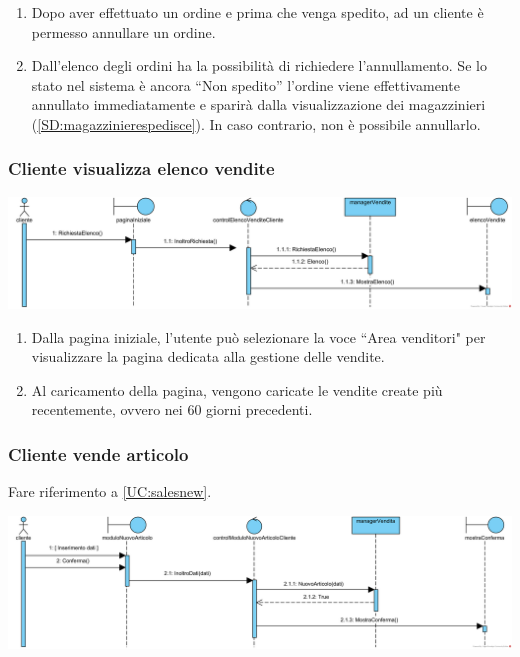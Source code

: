 \documentclass[12pt,a4paper]{article}
\begin{document}
\begin{enumerate}
\item Dopo aver effettuato un ordine e prima che venga spedito, ad un cliente è permesso annullare un ordine.
\item Dall'elenco degli ordini ha la possibilità di richiedere l'annullamento. Se lo stato nel sistema è ancora ``Non spedito'' l'ordine viene effettivamente annullato immediatamente e sparirà dalla visualizzazione dei magazzinieri (\ref{SD:magazzinierespedisce}). In caso contrario, non è possibile annullarlo.
\end{enumerate}

\newpage

\subsubsection{Cliente visualizza elenco vendite}
\label{SD:elencovendite}

\begin{center}
\includegraphics[width=\textwidth]{SequenceDiagram/ClienteVenditaElenco}
\end{center}

\begin{enumerate}
\item Dalla pagina iniziale, l'utente può selezionare la voce ``Area venditori" per visualizzare la pagina dedicata alla gestione delle vendite.
\item Al caricamento della pagina, vengono caricate le vendite create più recentemente, ovvero nei 60 giorni precedenti.
\end{enumerate}

\subsubsection{Cliente vende articolo}
\label{SD:creazionevendita}

Fare riferimento a \ref{UC:salesnew}. \\

\begin{center}
\includegraphics[width=\textwidth]{SequenceDiagram/ClienteVenditaCrea}
\end{center}
\end{document}

